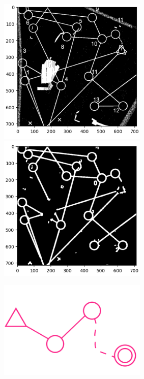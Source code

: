 \documentclass[a4paper,12pt]{extarticle}
\begin{document}
\begin{figure}[H]
    \centering
    \includegraphics[width=200pt]{unet_course_detection_input.png}
    \includegraphics[width=200pt]{unet_course_detection.png}
    \label{fig:unetcoursedetection}
\end{figure}
\begin{figure}[H]
    \centering
    \includegraphics[width=200pt]{sample_circuit_configuration.png}
    \label{fig:examplecircuit}
\end{figure}
\end{document}
